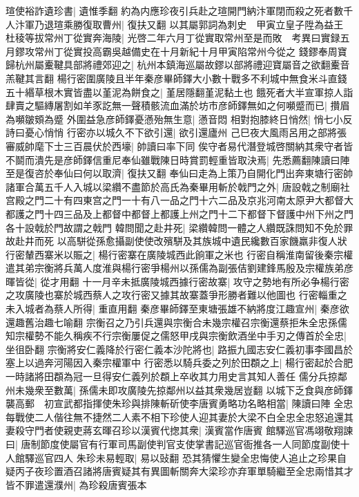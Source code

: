 瑄使裕詐遺珍書|{
	遺惟季翻}
約為内應珍夜引兵赴之瑄開門納汴軍閉而殺之死者數千人汴軍乃退瑄乘勝復取曹州|{
	復扶又翻}
以其屬郭詞為刺史　甲寅立皇子陞為益王　杜稜等拔常州丁從實奔海陵|{
	光啓二年六月丁從實取常州至是而敗　考異曰實録五月鏐攻常州丁從實投高霸吳越備史在十月新紀十月甲寅陷常州今從之}
錢鏐奉周寶歸杭州屬櫜鞬具部將禮郊迎之|{
	杭州本鎮海巡屬故鏐以部將禮迎寶屬音之欲翻櫜音羔鞬其言翻}
楊行密圍廣陵且半年秦彦畢師鐸大小數十戰多不利城中無食米斗直錢五十緡草根木實皆盡以堇泥為餅食之|{
	堇居隱翻堇泥黏土也}
餓死者大半宣軍掠人詣肆賣之驅縳屠割如羊豕訖無一聲積骸流血滿於坊市彦師鐸無如之何嚬蹙而已|{
	攢眉為嚬皺頞為蹙}
外圍益急彦師鐸憂懣殆無生意|{
	懣音悶}
相對抱膝終日悄然|{
	悄七小反詩曰憂心悄悄}
行密亦以城久不下欲引還|{
	欲引還廬州}
己巳夜大風雨呂用之部將張審威帥麾下士三百晨伏於西壕|{
	帥讀曰率下同}
俟守者易代潛登城啓關納其衆守者皆不鬬而潰先是彦師鐸信重尼奉仙雖戰陳日時賞罰輕重皆取決焉|{
	先悉薦翻陳讀曰陣}
至是復咨於奉仙曰何以取濟|{
	復扶又翻}
奉仙曰走為上策乃自開化門出奔東塘行密帥諸軍合萬五千人入城以梁纘不盡節於高氏為秦畢用斬於戟門之外|{
	唐設戟之制廟社宫殿之門二十有四東宫之門一十有八一品之門十六二品及京兆河南太原尹大都督大都護之門十四三品及上都督中都督上都護上州之門十二下都督下督護中州下州之門各十設戟於門故謂之戟門}
韓問聞之赴井死|{
	梁纘韓問一體之人纘既誅問知不免於罪故赴井而死}
以高駢從孫愈攝副使使改殯駢及其族城中遺民纔數百家饑羸非復人狀行密輦西寨米以賑之|{
	楊行密寨在廣陵城西此餉軍之米也}
行密自稱淮南留後秦宗權遣其弟宗衡將兵萬人度淮與楊行密爭楊州以孫儒為副張佶劉建鋒馬殷及宗權族弟彦暉皆從|{
	從才用翻}
十一月辛未抵廣陵城西據行密故寨|{
	攻守之勢地有所必争楊行密之攻廣陵也寨於城西蔡人之攻行密又據其故寨蓋爭形勝者難以他圖也}
行密輜重之未入城者為蔡人所得|{
	重直用翻}
秦彦畢師鐸至東塘張雄不納將度江趣宣州|{
	秦彦欲還趣舊治趣七喻翻}
宗衡召之乃引兵還與宗衡合未幾宗權召宗衡還蔡拒朱全忠孫儒知宗權勢不能久稱疾不行宗衡屢促之儒怒甲戌與宗衡飲酒坐中手刃之傳首於全忠|{
	坐徂卧翻}
宗衡將安仁義降於行密仁義本沙陀將也|{
	路振九國志安仁義初事李國昌於塞上以過奔河陽因入秦宗權軍中}
行密悉以騎兵委之列於田頵之上|{
	楊行密起於合肥一時諸將田頵為冠一旦得安仁義列於頵上卒收其力用史言其知人善任}
儒分兵掠鄰州未幾衆至數萬|{
	孫儒未即攻廣陵先掠鄰州以益其衆幾居豈翻}
以城下乏食與彦師鐸襲高郵　初宣武都指揮使朱珍與排陳斬斫使李唐賓勇略功名略相當|{
	陳讀曰陣}
全忠每戰使二人偕往無不捷然二人素不相下珍使人迎其妻於大梁不白全忠全忠怒追還其妻殺守門者使親吏蔣玄暉召珍以漢賓代揔其衆|{
	漢賓當作唐賓}
館驛巡官馮翊敬翔諫曰|{
	唐制節度使屬官有行軍司馬副使判官支使掌書記巡官衙推各一人同節度副使十人館驛巡官四人}
朱珍未易輕取|{
	易以䜴翻}
恐其猜懼生變全忠悔使人追止之珍果自疑丙子夜珍置酒召諸將唐賓疑其有異圖斬關奔大梁珍亦弃軍單騎繼至全忠兩惜其才皆不罪遣還濮州|{
	為珍殺唐賓張本}
